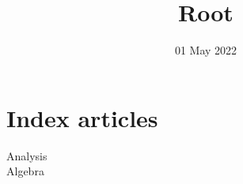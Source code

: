 
\title{Root}
\author{}
\date{01 May 2022}

\maketitle
\section{Index articles}
\begin{description}
    \item[Analysis] 
    \item[Algebra]  
\end{description}
